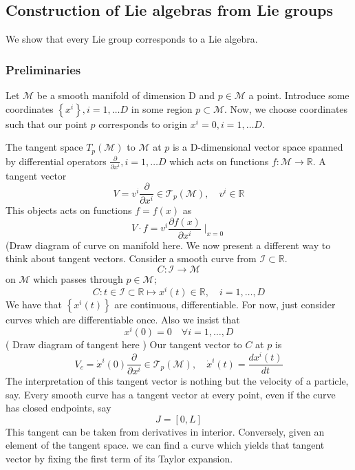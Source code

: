 \subsection{Construction of Lie algebras from Lie groups}
We show that every Lie group corresponds to a Lie algebra.

\subsubsection{Preliminaries} 
Let $ \mathcal{ M } $ be a smooth manifold of dimension D and $ p \in \mathcal{ M }$ a point. Introduce some coordinates $ \left\{  x^{ i  } \right\}, i = 1, \dots D $ in some region $ p \subset \mathcal{ M }$. Now, we choose coordinates such that our point $ p $ corresponds to origin $ x^{ i }  = 0 , i = 1, \dots D$. 

The tangent space $T_{ p } ( \mathcal{ M } ) $ to $ \mathcal{ M } $ at $ p $ is a D-dimensional vector space spanned by differential operators 
$ \frac{\partial  }{\partial x^{i }} , i = 1, \dots D $
which acts on functions $ f : \mathcal{ M  } \to  \mathbb{R} $. A tangent vector 
\[
	V = v^{i } \frac{\partial }{\partial x^{i  } } \in \mathcal{ T }_p ( \mathcal{ M }), \quad v^{ i } \in \mathbb{ R} 
\] This objects acts on functions $ f = f ( x) $ as 
\[
	V \cdot  f  = v^{ i } \frac{\partial  f ( x)  }{\partial x^{ i }} \mid_{ x = 0 } 
\] (Draw diagram of curve on manifold here. 
We now present a different way to think about tangent vectors. 
Consider  a smooth curve from $ \mathcal{ I } \subset \mathbb{ R} $. 
\[
 C : \mathcal{ I } \to  \mathcal{ M }
\] on $ \mathcal{ M } $ which passes through $ p \in \mathcal{ M }$; 
\[
	C : t \in \mathcal{ I } \subset \mathbb{ R} \mapsto x^{ i } ( t ) \in \mathbb{ R}, \quad i = 1, \dots, D 
\] We have that $ \left\{  x^{ i } ( t)  \right\} $ are continuous, differentiable. 
For now, just consider curves which are 
differentiable once. Also we insist that 
\[
	x^{ i } ( 0 )  = 0 \quad \forall i = 1, \dots, D 
\] ( Draw diagram of tangent here ) 
Our tangent vector to $ C $ at $ p $ is 
\[
	V_{ c }  = \dot { x}^{ i } ( 0 ) \frac{\partial }{\partial x^{ i }} \in \mathcal{ T }_p ( \mathcal{ M }), \quad \dot{ x}^{ i } (t ) = \frac{d x^{ i }( t) }{ dt }	\] The interpretation 
	of this tangent vector is nothing but the velocity of a 
	particle, say. 
Every smooth curve has a tangent vector at every point, even if 
the curve has closed endpoints, say 
\[
 J = [ 0 , L ] 
\] This tangent can be taken from derivatives in interior. 
Conversely, given an element of the tangent space. 
we can find a curve which yields that tangent vector 
by fixing the first term of its Taylor expansion. 

\pagebreak
